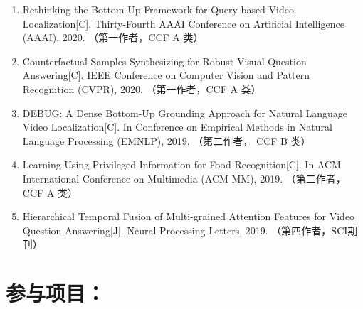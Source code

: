 \begin{publications}
\begin{enumerate}
\item{
Rethinking the Bottom-Up Framework for Query-based Video Localization[C].
Thirty-Fourth AAAI Conference on Artificial Intelligence (AAAI), 2020.
（第一作者，CCF A 类）
}

\item{
Counterfactual Samples Synthesizing for Robust Visual Question Answering[C].
IEEE Conference on Computer Vision and Pattern Recognition (CVPR), 2020.
（第一作者，CCF A 类）
}

\item{
DEBUG: A Dense Bottom-Up Grounding Approach for Natural Language Video Localization[C].
In Conference on Empirical Methods in Natural Language Processing (EMNLP), 2019.
（第二作者， CCF B 类）
}

\item{
Learning Using Privileged Information for Food Recognition[C].
In ACM International Conference on Multimedia (ACM MM), 2019.
（第二作者，CCF A 类）
}

\item{
Hierarchical Temporal Fusion of Multi-grained Attention Features for Video Question Answering[J]. 
Neural Processing Letters, 2019. 
（第四作者，SCI期刊）
} 
\end{enumerate}

\section*{参与项目：}



\end{publications}
